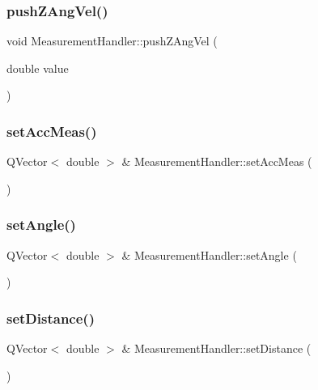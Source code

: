 \mbox{\label{class_measurement_handler_a5155e86de3d5e138a3f510cbe9cc3932}} 
\subsubsection{push\+Z\+Ang\+Vel()}
{\footnotesize\ttfamily void Measurement\+Handler\+::push\+Z\+Ang\+Vel (\begin{DoxyParamCaption}\item[{double}]{value }\end{DoxyParamCaption})}

\mbox{\label{class_measurement_handler_ab31bf9f532b402898b3df7f27301f4c1}} 
\subsubsection{set\+Acc\+Meas()}
{\footnotesize\ttfamily Q\+Vector$<$ double $>$ \& Measurement\+Handler\+::set\+Acc\+Meas (\begin{DoxyParamCaption}{ }\end{DoxyParamCaption})}

\mbox{\label{class_measurement_handler_a4ba0133931c03ce76c0778cce53f0036}} 
\subsubsection{set\+Angle()}
{\footnotesize\ttfamily Q\+Vector$<$ double $>$ \& Measurement\+Handler\+::set\+Angle (\begin{DoxyParamCaption}{ }\end{DoxyParamCaption})}

\mbox{\label{class_measurement_handler_aaefca8d2644ed80b6318c7014cde5a57}} 
\subsubsection{set\+Distance()}
{\footnotesize\ttfamily Q\+Vector$<$ double $>$ \& Measurement\+Handler\+::set\+Distance (\begin{DoxyParamCaption}{ }\end{DoxyParamCaption})}

